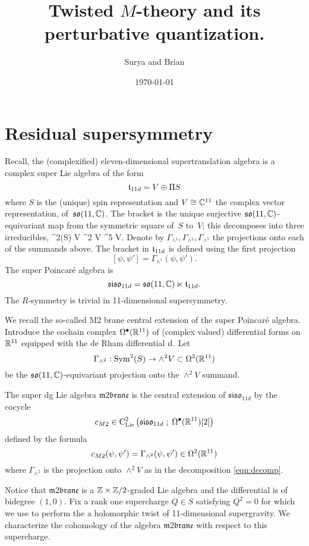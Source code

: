 \documentclass[11pt]{amsart}
\author{Surya and Brian}
\date{\today}
\title{Twisted \(M\)-theory and its perturbative quantization.}
\def\m2{\mathfrak{m}2\mathfrak{brane}}
\def\so{\mathfrak{so}}
\def\siso{\mathfrak{siso}}
\def\lie#1{\ensuremath{\mathfrak{#1}}}
\begin{document}
\maketitle
\tableofcontents


\section{Residual supersymmetry}


Recall, the (complexified) eleven-dimensional supertranslation algebra is a complex super Lie algebra of the form
\[
  \mathfrak t_{11d} = V \oplus \Pi S
\]
where $S$ is the (unique) spin representation and $V \cong \mathbb C^{11}$ the complex vector representation, of~$\lie{so}(11, \CC)$. 
The bracket is the unique surjective $\lie{so}(11,\CC)$-equivariant map from the symmetric square of~$S$ to~$V$;
this decomposes into three irreducibles, 
\beqn\label{eqn:decomp}
  \Sym^2(S) \cong V \oplus \wedge^2 V \oplus \wedge^5 V.
\eeqn
Denote by $\Gamma_{\wedge^1}, \Gamma_{\wedge^2}, \Gamma_{\wedge^5}$ the projections onto each of the summands above. 
The bracket in $\mathfrak t_{11d}$ is defined using the first projection
\[
[\psi, \psi'] = \Gamma_{\wedge^1} (\psi, \psi') .
\]
The super Poincar\'{e} algebra is
\[
  \siso_{11d} = \so(11 , \CC) \ltimes \ft_{11d} .
\]
The $R$-symmetry is trivial in 11-dimensional supersymmetry. 

We recall the so-called M2 brane central extension of the super Poincar\'e algebra.
Introduce the cochain complex $\Omega^{\bullet}(\mathbb R^{11})$ of (complex valued) differential forms on $\mathbb R^{11}$ equipped with the de Rham differential ${\rm d}$.  
Let
\[
  \Gamma_{\wedge^2} : \operatorname{Sym}^2(S) \to \wedge^2 V \subset \Omega^2(\mathbb R^{11}) 
\]
be the $\lie{so}(11,\CC)$-equivariant projection onto the $\wedge^2 V$ summand.

The super dg Lie algebra $\m2$ is the central extension of $\siso_{11d}$ by the cocycle
  \[
    c_{M2} \in \clie^2\left(\siso_{11d} \; ; \; \Omega^\bu (\RR^{11})[2]\right)
  \]
  defined by the formula 
  \[c_{M2} (\psi, \psi') = \Gamma_{\wedge^2}(\psi, \psi') \in \Omega^2(\mathbb R^{11})\]
  where $\Gamma_{\wedge^2}$ is the projection onto $\wedge^2 V$ as in the decomposition \eqref{eqn:decomp}. 

Notice that $\m2$ is a $\mathbb Z \times \mathbb Z/2$-graded Lie algebra and the differential is of bidegree $(1,0)$.
Fix a rank one supercharge $Q \in S$ satisfying $Q^2 = 0$ for which we use to perform the a holomorphic twist of 11-dimensional supergravity.  
We characterize the cohomology of the algebra $\m2$ with respect to this supercharge. 
\end{document}
